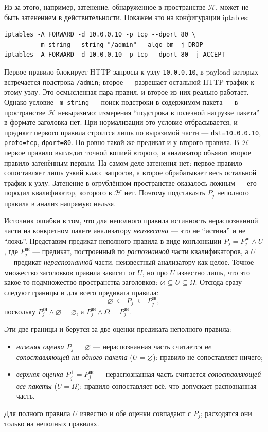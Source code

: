 Из-за этого, например, затенение, обнаруженное в пространстве $\mathcal{H}$, может не быть затенением в действительности. Покажем это на конфигурации iptables:
\begin{verbatim}
iptables -A FORWARD -d 10.0.0.10 -p tcp --dport 80 \
         -m string --string "/admin" --algo bm -j DROP
iptables -A FORWARD -d 10.0.0.10 -p tcp --dport 80 -j ACCEPT
\end{verbatim}
Первое правило блокирует HTTP-запросы к узлу \texttt{10.0.0.10}, в payload которых встречается подстрока \texttt{/admin}; второе --- разрешает остальной HTTP-трафик к этому узлу. Это осмысленная пара правил, и второе из них реально работает. Однако условие \texttt{-m string} --- поиск подстроки в содержимом пакета --- в пространстве $\mathcal{H}$ невыразимо: измерения ``подстрока в полезной нагрузке пакета'' в формате заголовка нет. При нормализации это условие отбрасывается, и предикат первого правила строится лишь по выразимой части --- \texttt{dst=10.0.0.10}, \texttt{proto=tcp}, \texttt{dport=80}. Но ровно такой же предикат и у второго правила. В $\mathcal{H}$ первое правило выглядит точной копией второго, и анализатор объявит второе правило затенённым первым. На самом деле затенения нет: первое правило сопоставляет лишь узкий класс запросов, а второе обрабатывает весь остальной трафик к узлу. Затенение в огрублённом пространстве оказалось ложным --- его породил квалификатор, которого в $\mathcal{H}$ нет. Поэтому подставлять $P_j$ неполного правила в анализ напрямую нельзя.

Источник ошибки в том, что для неполного правила истинность нераспознанной части на конкретном пакете анализатору \emph{неизвестна} --- это не ``истина'' и не ``ложь''. Представим предикат неполного правила в виде конъюнкции $P_j = P_j^{\text{зн}} \wedge U$, где $P_j^{\text{зн}}$ --- предикат, построенный по \emph{распознанной} части квалификаторов, а $U$ --- предикат \emph{нераспознанной} части, неизвестный анализатору как целое. Точное множество заголовков правила зависит от $U$, но про $U$ известно лишь, что это какое-то подмножество пространства заголовков: $\varnothing \subseteq U \subseteq \Omega$. Отсюда сразу следуют границы и для всего предиката правила:
\[
\varnothing \;\subseteq\; P_j \;\subseteq\; P_j^{\text{зн}},
\]
поскольку $P_j^{\text{зн}} \wedge \varnothing = \varnothing$, а $P_j^{\text{зн}} \wedge \Omega = P_j^{\text{зн}}$.

Эти две границы и берутся за две оценки предиката неполного правила:
\begin{itemize}
    \item \emph{нижняя оценка} $P_j^- = \varnothing$ --- нераспознанная часть считается \emph{не сопоставляющей ни одного пакета} ($U = \varnothing$): правило не сопоставляет ничего;
    \item \emph{верхняя оценка} $P_j^+ = P_j^{\text{зн}}$ --- нераспознанная часть считается \emph{сопоставляющей все пакеты} ($U = \Omega$): правило сопоставляет всё, что допускает распознанная часть.
\end{itemize}
Для полного правила $U$ известно и обе оценки совпадают с $P_j$; расходятся они только на неполных правилах.

